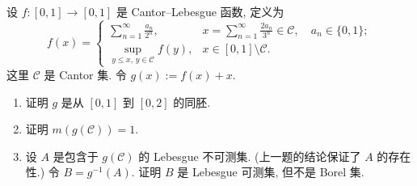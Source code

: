\documentclass{article}
\begin{document}
\begin{problem}
  设 $f:[0,1]\to[0,1]$ 是 Cantor--Lebesgue 函数, 定义为
  \[
    f(x)=
    \begin{cases}
      \displaystyle\sum_{n=1}^{\infty}\frac{a_n}{2^n},
        & \displaystyle x=\sum_{n=1}^{\infty}\frac{2a_n}{3^n}\in\mathcal{C},\quad a_n\in\{0,1\};\\[6pt]
      \displaystyle\sup_{y\leq x,\,y\in\mathcal{C}}f(y),
        & x\in[0,1]\setminus\mathcal{C}.
    \end{cases}
  \]
  这里 $\mathcal{C}$ 是 Cantor 集. 令 $g(x):=f(x)+x$.
  \begin{enumerate}
    \item[(a)] 证明 $g$ 是从 $[0,1]$ 到 $[0,2]$ 的同胚.
    \item[(b)] 证明 $m(g(\mathcal{C}))=1$.
    \item[(c)] 设 $A$ 是包含于 $g(\mathcal{C})$ 的 Lebesgue 不可测集. (上一题的结论保证了 $A$ 的存在性.) 令 $B=g^{-1}(A)$. 证明 $B$ 是 Lebesgue 可测集, 但不是 Borel 集.
  \end{enumerate}
\end{problem}
\end{document}
